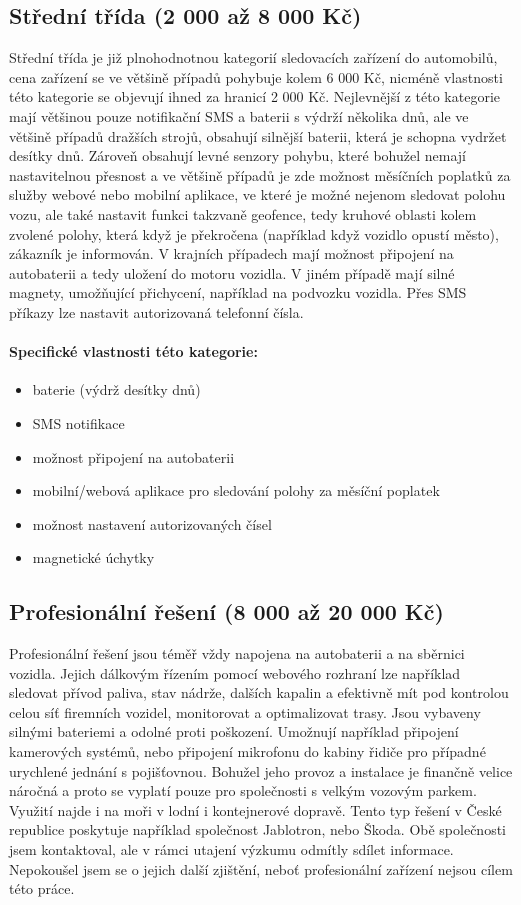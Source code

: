 \documentclass[FM,MP]{tulthesis}  %
\begin{document}
\subsection{Střední třída (2 000 až 8 000 Kč)}
Střední třída je již plnohodnotnou kategorií sledovacích zařízení do automobilů, cena zařízení se ve většině případů pohybuje kolem 6 000 Kč, nicméně vlastnosti této kategorie se objevují ihned za hranicí 2 000 Kč. Nejlevnější z této kategorie mají většinou pouze notifikační SMS a baterii s výdrží několika dnů, ale ve většině případů dražších strojů, obsahují silnější baterii, která je schopna vydržet desítky dnů. Zároveň obsahují levné senzory pohybu, které bohužel nemají nastavitelnou přesnost a ve většině případů je zde možnost měsíčních poplatků za služby webové nebo mobilní aplikace, ve které je možné nejenom sledovat polohu vozu, ale také nastavit funkci takzvaně geofence, tedy kruhové oblasti kolem zvolené polohy, která když je překročena (například když vozidlo opustí město), zákazník je informován. V krajních případech mají možnost připojení na autobaterii a tedy uložení do motoru vozidla. V jiném případě mají silné magnety, umožňující přichycení, například na podvozku vozidla. Přes SMS příkazy lze nastavit autorizovaná telefonní čísla.

\paragraph{Specifické vlastnosti této kategorie:}
\begin{itemize}
\item baterie (výdrž desítky dnů)
\item SMS notifikace
\item možnost připojení na autobaterii
\item mobilní/webová aplikace pro sledování polohy za měsíční poplatek
\item možnost nastavení autorizovaných čísel
\item magnetické úchytky
\end{itemize}

\subsection{Profesionální řešení (8 000 až 20 000 Kč)}
Profesionální řešení jsou téměř vždy napojena na autobaterii a na sběrnici vozidla. Jejich dálkovým řízením pomocí webového rozhraní lze například sledovat přívod paliva, stav nádrže, dalších kapalin a efektivně mít pod kontrolou celou síť firemních vozidel, monitorovat a optimalizovat trasy. Jsou vybaveny silnými bateriemi a odolné proti poškození. Umožnují například připojení kamerových systémů, nebo připojení mikrofonu do kabiny řidiče pro případné urychlené jednání s pojišťovnou. Bohužel jeho provoz a instalace je finančně velice náročná a proto se vyplatí pouze pro společnosti s velkým vozovým parkem. Využití najde i na moři v lodní i kontejnerové dopravě. Tento typ řešení v České republice poskytuje například společnost Jablotron, nebo Škoda. Obě společnosti jsem kontaktoval, ale v rámci utajení výzkumu odmítly sdílet informace. Nepokoušel jsem se o jejich další zjištění, neboť profesionální zařízení nejsou cílem této práce. 
\end{document}

